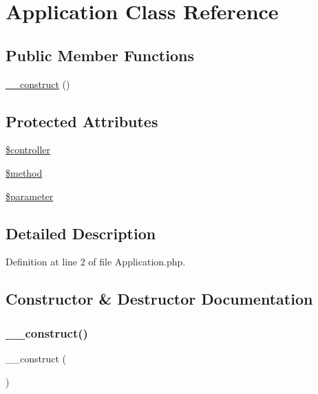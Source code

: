 \hypertarget{class_application}{}\section{Application Class Reference}
\label{class_application}
\subsection*{Public Member Functions}
\begin{DoxyCompactItemize}
\item 
\hyperlink{class_application_a095c5d389db211932136b53f25f39685}{\+\_\+\+\_\+construct} ()
\end{DoxyCompactItemize}
\subsection*{Protected Attributes}
\begin{DoxyCompactItemize}
\item 
\hyperlink{class_application_a0eb1786d89f8acef683a1fbeeeb87518}{\$controller}
\item 
\hyperlink{class_application_a12661b2fc0f57f97e30a1620889ce9c6}{\$method}
\item 
\hyperlink{class_application_aaa59205ae9efcb66a11d385fe346253a}{\$parameter}
\end{DoxyCompactItemize}


\subsection{Detailed Description}


Definition at line 2 of file Application.\+php.



\subsection{Constructor \& Destructor Documentation}
\hypertarget{class_application_a095c5d389db211932136b53f25f39685}{}\label{class_application_a095c5d389db211932136b53f25f39685} 
\subsubsection{\texorpdfstring{\+\_\+\+\_\+construct()}{\_\_construct()}}
{\footnotesize\ttfamily \+\_\+\+\_\+construct (\begin{DoxyParamCaption}{ }\end{DoxyParamCaption})}

